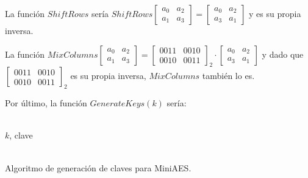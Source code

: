 	La función $ShiftRows$ sería $ShiftRows \left[\begin{matrix}a_0 & a_2\\ a_1 & a_3\end{matrix}\right]
	= \left[\begin{matrix}a_0 & a_2 \\ a_3 & a_1\end{matrix}\right]$ y es su propia inversa.
	
	La función $MixColumns \left[\begin{matrix}a_0 & a_2\\ a_1 & a_3\end{matrix}\right] =
	\left[\begin{matrix}0011 & 0010 \\ 0010 & 0011\end{matrix}\right]_2 \cdot \left[\begin{matrix}a_0 & a_2 \\
	a_3 & a_1\end{matrix}\right]$ y dado que $\left[\begin{matrix}0011 & 0010 \\ 0010 & 0011\end{matrix}\right]_2$
	es su propia inversa, $MixColumns$ también lo es.
	
	Por último, la función $GenerateKeys(k)$ sería:
	\begin{algorithm}[H]
		\begin{algorithmic}[1]
			\REQUIRE \ \\
				\texttt{$k$}, clave\\ \
			\STATE{\texttt{$\omega_5 = \omega_1 \oplus \omega_4$}}
			\STATE{\texttt{$\omega_9 = \omega_5 \oplus \omega_8$}}

		\end{algorithmic}
		\caption{Algoritmo de generación de claves para MiniAES.}
		\label{GenKeys}
	\end{algorithm}
	
